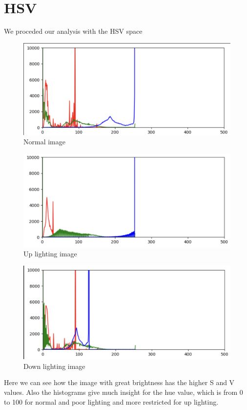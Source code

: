 \documentclass{report}
\begin{document}
\section{HSV}
We proceded our analysis with the HSV space
\begin{figure}[H]
\includegraphics[scale=0.4]{Images/HSVNormal.png}
 \caption{Normal image}
\centering
\end{figure}
\begin{figure}[H]
\includegraphics[scale=0.4]{Images/HSVUp.png}
 \caption{Up lighting image}
\centering
\end{figure}
\begin{figure}[H]
\includegraphics[scale=0.4]{Images/HSVDown.png}
 \caption{Down lighting image}
\centering
\end{figure}
Here we can see how the image with great brightness has the higher S and V values. 
Also the histograms give much insight for the hue value, which is from 0 to 100 for normal and
poor lighting and more restricted for up lighting.
\end{document}
